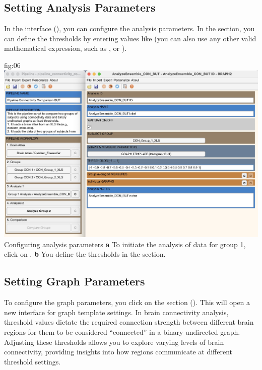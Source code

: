 \documentclass[justified]{tufte-handout}
\begin{document}
\subsection{Setting Analysis Parameters}

In the  interface (), you can configure the analysis parameters.
In the  section, you can define the thresholds by entering values like  (you can also use any other valid mathematical expression, such as , or ).

	{fig:06}
	{
	\includegraphics{fig06.jpg}
	}
	{Configuring analysis parameters}
	{
	{\bf a} To initiate the analysis of data for group 1, click on .
	{\bf b} You define the thresholds in the section.
	}

\subsection{Setting Graph Parameters}

To configure the graph parameters, you click on the section  (). This will open a new interface for graph template settings. 
In brain connectivity analysis, threshold values dictate the required connection strength between different brain regions for them to be considered “connected” in a binary undirected graph. 
Adjusting these thresholds allows you to explore varying levels of brain connectivity, providing insights into how regions communicate at different threshold settings.
\end{document}
